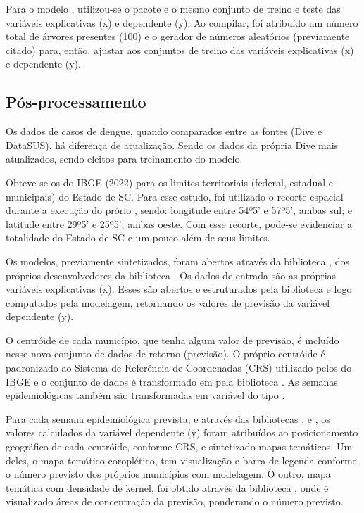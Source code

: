 \documentclass[
	12pt,				%
	openright,			%
	oneside,			%
	a4paper,			%
	english,			%
	french,				%
	spanish,			%
	brazil				%
	dvipsnames, table]{abntex2}
\begin{document}
\indent Para o modelo , utilizou-se o pacote  e o mesmo conjunto de treino e teste das variáveis explicativas (x) e dependente (y). Ao compilar, foi atribuído um número total de árvores presentes (100) e o gerador de números aleatórios (previamente citado) para, então, ajustar aos conjuntos de treino das variáveis explicativas (x) e dependente (y).

\subsection{Pós-processamento}

\indent Os dados de casos de dengue, quando comparados entre as fontes (\acrshort{Dive} e \acrshort{DataSUS}), há diferença de atualização. Sendo os dados da própria \acrshort{Dive} mais atualizados, sendo eleitos para treinamento do modelo.

\indent Obteve-se os  do \acrshort{IBGE} (2022) para os limites territoriais (federal, estadual e municipais) do Estado de \acrlong{SC}. Para esse estudo, foi utilizado o recorte espacial durante a execução do prório , sendo: longitude entre 54º5' e 57º5', ambas sul; e latitude entre 29º5' e 25º5', ambas oeste. Com esse recorte, pode-se evidenciar a totalidade do Estado de \acrlong{SC} e um pouco além de seus limites.

\indent Os modelos, previamente sintetizados, foram abertos através da biblioteca , dos próprios desenvolvedores da biblioteca . Os dados de entrada são as próprias variáveis explicativas (x). Esses são abertos e estruturados pela biblioteca  e logo computados pela modelagem, retornando os valores de previsão da variável dependente (y).

\indent O centróide de cada município, que tenha algum valor de previsão, é incluído nesse novo conjunto de dados de retorno (previsão). O próprio centróide é padronizado ao Sistema de Referência de Coordenadas (\acrfull{CRS}) utilizado pelos  do \acrshort{IBGE} e o conjunto  de dados é transformado em  pela biblioteca . As semanas epidemiológicas também são transformadas em variável do tipo .

\indent Para cada semana epidemiológica prevista, e através das bibliotecas ,  e , os valores calculados da variável dependente (y) foram atribuídos ao posicionamento geográfico de cada centróide, conforme \acrshort{CRS}, e sintetizado mapas temáticos. Um deles, o mapa temático coroplético, tem visualização e barra de legenda conforme o número previsto dos próprios municípios com modelagem. O outro, mapa temática com densidade de kernel, foi obtido através da biblioteca , onde é visualizado áreas de concentração da previsão, ponderando o número previsto.
\end{document}
